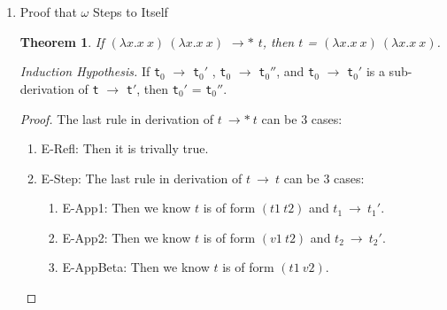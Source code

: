\documentclass{article}
\newtheorem{thm}{Theorem}
\begin{document}
\begin{description}
\begin{enumerate}
\begin{proof}
\begin{enumerate}
        \item E-IfFalse: A similar argument holds.

        \item E-If: \verb|t|$_1$ must take a step to some \verb|t|$_1'$, and \verb|t| has the form
        \verb|if t|$_1$ \verb|then t|$_2$ \verb|else t|$_3$.
        The last rule in derivation of \verb|t| $\longrightarrow$ \verb|t|$''$ can be 3 cases:
          \begin{enumerate}
            \item E-IfTrue: \verb|t|$_1$ is \verb|true|, and values can't take a step.
            \item E-IfFalse: A similar argument holds.
            \item E-If: then \verb|t|$_1$ must take a step to some \verb|t|$_1''$. By the inductive hypothesis, since we know \verb|t|$_1$ steps to both \verb|t|$_1'$ and \verb|t|$_1''$,
            then \verb|t|$_1'$ and \verb|t|$_1''$ must be the same.
            \end{enumerate}
      \end{enumerate}
    \end{proof}

  \item{Proof that $\omega$ Steps to Itself}
    \begin{thm}If $(\lambda x.x\ x)\ (\lambda x.x\ x)$ $\longrightarrow*$ $t$,
      then $t$ = $(\lambda x.x\ x)\ (\lambda x.x\ x)$.
    \end{thm}

    \textit{Induction Hypothesis.} If \verb|t|$_0$ $\longrightarrow$ \verb|t|$_0'$ , \verb|t|$_0$ $\longrightarrow$ \verb|t|$_0''$, and \verb|t|$_0$ $\longrightarrow$ \verb|t|$_0'$ is a sub-derivation of \verb|t| $\longrightarrow$ \verb|t|$'$, then \verb|t|$_0'$ = \verb|t|$_0''$.

    \begin{proof}
      The last rule in derivation of $t\ \longrightarrow*\ t$ can be 3 cases:
      \begin{enumerate}
        \item E-Refl: Then it is trivally true.

        \item E-Step:
            The last rule in derivation of $t\ \longrightarrow\ t$ can be 3 cases:
            \begin{enumerate}
            \item E-App1: Then we know $t$ is of form $(t1\ t2)$ and $t_1\ \longrightarrow\ t_1'$.
            \item E-App2: Then we know $t$ is of form $(v1\ t2)$ and $t_2\ \longrightarrow\ t_2'$.
            \item E-AppBeta: Then we know $t$ is of form $(t1\ v2)$.


\end{enumerate}
\end{enumerate}
\end{proof}
\end{enumerate}
\end{description}
\end{document}
